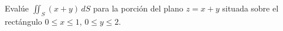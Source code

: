 Evalúe $\iint_S (x+y)\,dS$ para la porción del plano $z=x+y$ situada sobre el rectángulo $0\leq x\leq1$, $0\leq y\leq2$.
